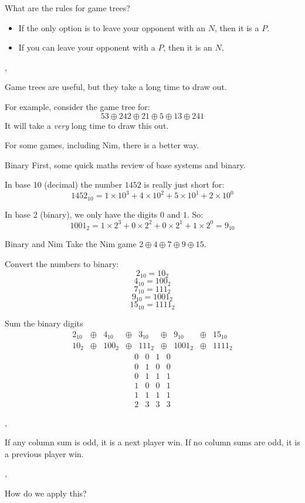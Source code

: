	\begin{namedframe}{What are the rules for game trees?}
		\begin{itemize}
			\item If the only option is to leave your opponent with an $N$, then it is a $P$.
			\item If you can leave your opponent with a $P$, then it is an $N$.
		\end{itemize}

		\sep

		Game trees are useful, but they take a long time to draw out.

		For example, consider the game tree for:
		\[53 \oplus 242 \oplus 21 \oplus 5 \oplus 13 \oplus 241\]
		It will take a \emph{very} long time to draw this out.

		For some games, including Nim, there is a better way.
	\end{namedframe}
	\begin{namedframe}{Binary}
		First, some quick maths review of base systems and binary.

		In base 10 (decimal) the number $1452$ is really just short for:
		\[1452_{10} = 1 \times 10^3 + 4 \times 10^2 + 5 \times 10^1 + 2 \times 10^0\]

		In base 2 (binary), we only have the digits $0$ and $1$. So:
		\[1001_2 = 1 \times 2^3 + 0 \times 2^2 + 0 \times 2^1 + 1 \times 2^0 = 9_{10}\]
	\end{namedframe}
	\begin{namedframe}{Binary and Nim}
		Take the Nim game $2 \oplus 4 \oplus 7 \oplus 9 \oplus 15$.

		Convert the numbers to binary:
		\[2_{10} = 10_2\]
		\[4_{10} = 100_2\]
		\[7_{10} = 111_2\]
		\[9_{10} = 1001_2\]
		\[15_{10} = 1111_2\]
	\end{namedframe}
	\begin{namedframe}{Sum the binary digits}
		\begin{equation*}
			\begin{array}{ccccccccc}
				2_{10} &\oplus& 4_{10} &\oplus& 3_{10} &\oplus& 9_{10} &\oplus& 15_{10}\\
				10_2   &\oplus& 100_2  &\oplus& 111_2  &\oplus& 1001_2 &\oplus& 1111_2
			\end{array}
		\end{equation*}
		\begin{equation*}
			\begin{array}{rrrr}
				0 & 0 & 1 & 0\\
				0 & 1 & 0 & 0\\
				0 & 1 & 1 & 1\\
				1 & 0 & 0 & 1\\
				1 & 1 & 1 & 1\\\hline
				2 & 3 & 3 & 3
			\end{array}
		\end{equation*}

		\sep

		If any column sum is odd, it is a next player win. If no column sums are odd, it is a previous player win.

		\sep

		How do we apply this?
	\end{namedframe}
